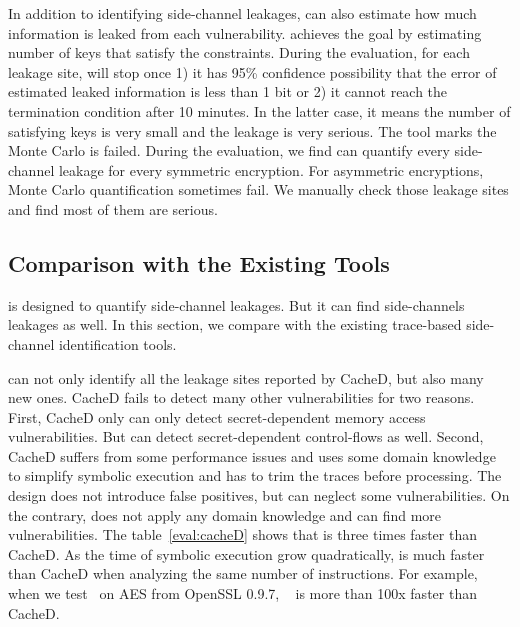 In addition to identifying side-channel leakages, \tool{} can also estimate how
much information is leaked from each vulnerability. \tool{} achieves 
the goal by estimating number of keys that satisfy the constraints.
During the evaluation, for each leakage site, 
\tool{} will stop once 1) it has 95\% confidence 
possibility that the error of estimated leaked information is less than
1 bit or 2) it cannot reach the termination condition after 10 minutes. In 
the latter case, it means the number of satisfying keys is very small and the leakage is 
very serious. The tool marks the Monte Carlo is failed. During the 
evaluation, we find \tool{} can quantify every side-channel leakage 
for every symmetric encryption. For asymmetric encryptions, Monte 
Carlo quantification sometimes fail. We manually check those leakage 
sites and find most of them are serious. 

\subsection{Comparison with the Existing Tools}\label{eval:comparison}
\tool{} is designed to quantify side-channel leakages. But it can
find side-channels leakages as well. In this section, we compare 
\tool{} with the existing trace-based side-channel identification 
tools.

\tool{} can not only identify all the leakage sites reported by CacheD,
but also many new ones.
CacheD fails to detect many other vulnerabilities for two
reasons. First, CacheD only can only detect secret-dependent
memory access vulnerabilities. But \tool{} can detect 
secret-dependent control-flows as well. Second, CacheD suffers
from some performance issues and uses some domain knowledge 
to simplify symbolic execution and has to trim the traces before processing. The design does 
not introduce false positives, but can neglect some vulnerabilities. 
On the contrary, \tool{} does not apply any domain knowledge and can find
more vulnerabilities. The table~\ref{eval:cacheD} shows that \tool{} is 
three times faster than CacheD. As the time of symbolic execution grow
quadratically, \tool{} is much faster than CacheD when analyzing the same
number of instructions. For example, when we test~\tool{} on 
AES from OpenSSL 0.9.7, ~\tool{} is more than 100x faster than CacheD.


